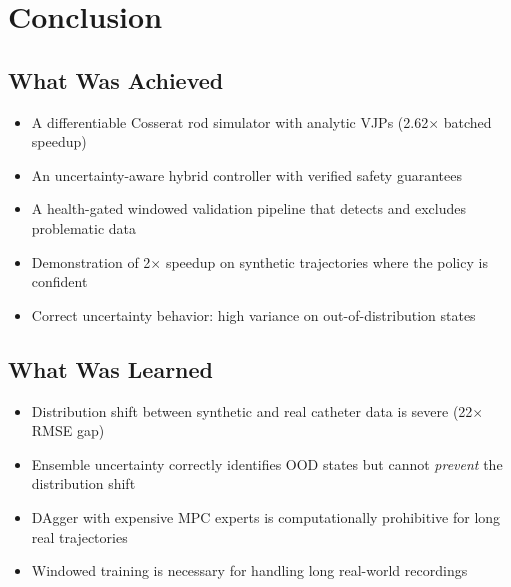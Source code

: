 \documentclass[conference]{IEEEtran}
\begin{document}
\section{Conclusion}

\subsection{What Was Achieved}

\begin{itemize}
\item A differentiable Cosserat rod simulator with analytic VJPs (2.62$\times$ batched speedup)
\item An uncertainty-aware hybrid controller with verified safety guarantees
\item A health-gated windowed validation pipeline that detects and excludes problematic data
\item Demonstration of 2$\times$ speedup on synthetic trajectories where the policy is confident
\item Correct uncertainty behavior: high variance on out-of-distribution states
\end{itemize}

\subsection{What Was Learned}

\begin{itemize}
\item Distribution shift between synthetic and real catheter data is severe (22$\times$ RMSE gap)
\item Ensemble uncertainty correctly identifies OOD states but cannot \emph{prevent} the distribution shift
\item DAgger with expensive MPC experts is computationally prohibitive for long real trajectories
\item Windowed training is necessary for handling long real-world recordings
\end{itemize}
\end{document}
